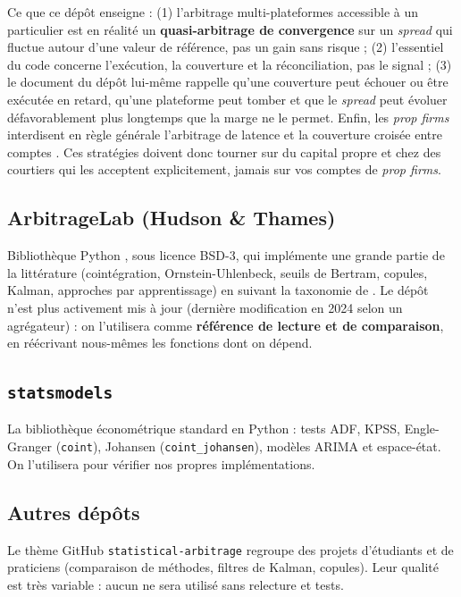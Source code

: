 \documentclass[11pt,a4paper]{article}
\begin{document}
\begin{pitfall}
Ce que ce dépôt enseigne : (1) l'arbitrage \og multi-plateformes\fg{} accessible à un particulier est en réalité un \textbf{quasi-arbitrage de convergence} sur un \emph{spread} qui fluctue autour d'une valeur de référence, pas un gain sans risque ; (2) l'essentiel du code concerne l'exécution, la couverture et la réconciliation, pas le signal ; (3) le document du dépôt lui-même rappelle qu'une couverture peut échouer ou être exécutée en retard, qu'une plateforme peut tomber et que le \emph{spread} peut évoluer défavorablement plus longtemps que la marge ne le permet. Enfin, les \emph{prop firms} interdisent en règle générale l'arbitrage de latence et la couverture croisée entre comptes \citep{nexusfi}. Ces stratégies doivent donc tourner sur du capital propre et chez des courtiers qui les acceptent explicitement, jamais sur vos comptes de \emph{prop firms}.
\end{pitfall}

\subsection{ArbitrageLab (Hudson \& Thames)}
Bibliothèque Python \citep{arbitragelab}, sous licence BSD-3, qui implémente une grande partie de la littérature (cointégration, Ornstein-Uhlenbeck, seuils de Bertram, copules, Kalman, approches par apprentissage) en suivant la taxonomie de \citet{krauss2017survey}. Le dépôt n'est plus activement mis à jour (dernière modification en 2024 selon un agrégateur) : on l'utilisera comme \textbf{référence de lecture et de comparaison}, en réécrivant nous-mêmes les fonctions dont on dépend.

\subsection{\texttt{statsmodels}}
La bibliothèque économétrique standard en Python \citep{statsmodels} : tests ADF, KPSS, Engle-Granger (\texttt{coint}), Johansen (\texttt{coint\_johansen}), modèles ARIMA et espace-état. On l'utilisera pour vérifier nos propres implémentations.

\subsection{Autres dépôts}
Le thème GitHub \texttt{statistical-arbitrage} regroupe des projets d'étudiants et de praticiens (comparaison de méthodes, filtres de Kalman, copules). Leur qualité est très variable : aucun ne sera utilisé sans relecture et tests.
\end{document}
